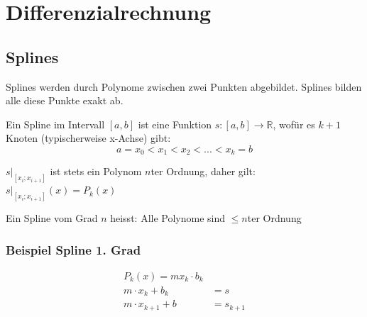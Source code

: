 \section{Differenzialrechnung}

\subsection{Splines}

	Splines werden durch Polynome zwischen zwei Punkten abgebildet.	Splines bilden alle diese Punkte exakt ab.
	
	Ein Spline im Intervall $[a,b]$ ist eine Funktion $s: [a,b] \to \mathbb{R}$, wofür es $k+1$ Knoten (typischerweise x-Achse) gibt:
	\[
	a = x_0 < x_1 < x_2 < ... < x_k = b
	\]
	
	$s|_{[x_i;x_{i+1}]}$ ist stets ein Polynom $n$ter Ordnung, daher gilt: $s|_{[x_i;x_{i+1}]}(x) = P_k(x)$
	
	Ein Spline vom Grad $n$ heisst: Alle Polynome sind $\leq n$ter Ordnung
	
	\subsubsection{Beispiel Spline 1. Grad}
	
	\begin{align*}
		P_k(x) = mx_k \cdot b_k \\
		m \cdot x_k + b_k &= s \\
		m \cdot x_{k+1} + b &= s_{k + 1}
	\end{align*}
